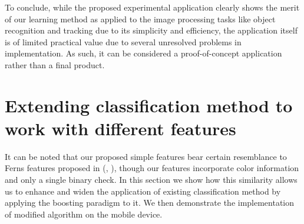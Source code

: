 To conclude, while the proposed experimental application clearly shows the merit of our learning method as applied to the image processing tasks like object recognition and tracking due to its simplicity and efficiency, the application itself is of limited practical value due to several unresolved problems in implementation. As such, it can be considered a proof-of-concept application rather than a final product. 



\section{Extending classification method to work with different features}
It can be noted that our proposed simple features bear certain resemblance to Ferns features proposed in (\cite{Ferns1}, \cite{Ferns2}), though our features incorporate color information and only a single binary check. In this section we show how this similarity allows us to enhance and widen the application of existing classification method by applying the boosting paradigm to it.
 We then demonstrate the implementation of modified algorithm on the mobile device.
